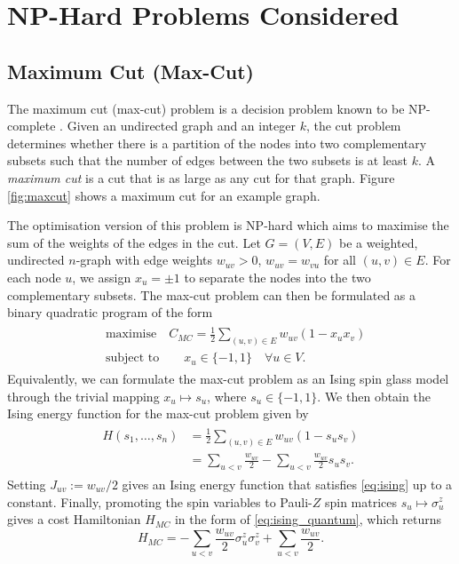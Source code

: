 
\section{NP-Hard Problems Considered} \label{sec:problem}
    \subsection{Maximum Cut (Max-Cut)}
        The maximum cut (max-cut) problem is a decision problem known to be NP-complete \cite{karp2010reducibility}. Given an undirected graph and an integer $k$, the cut problem determines whether there is a partition of the nodes into two complementary subsets such that the number of edges between the two subsets is at least $k$. A \emph{maximum cut} is a cut that is as large as any cut for that graph. Figure \ref{fig:maxcut} shows a maximum cut for an example graph.

        The optimisation version of this problem is NP-hard which aims to maximise the sum of the weights of the edges in the cut. Let $G=(V,E)$ be a weighted, undirected $n$-graph with edge weights $w_{uv}>0$, $w_{uv}=w_{vu}$ for all $(u,v)\in E$. For each node $u$, we assign $x_u=\pm1$ to separate the nodes into the two complementary subsets. The max-cut problem can then be formulated as a binary quadratic program of the form 
        \begin{align}
        \begin{split}
            &\text{maximise} \quad  C_{MC}=\frac{1}{2}\sum_{(u,v)\in E}w_{uv}(1-x_ux_v) \\
            &\text{subject to} \quad\quad x_u\in\{-1,1\}\quad\forall u\in V.
        \end{split}
        \end{align}
        Equivalently, we can formulate the max-cut problem as an Ising spin glass model  through the trivial mapping $x_u\mapsto s_u$, where $s_u\in\{-1,1\}$. We then obtain the Ising energy function for the max-cut problem given by
        \begin{align}
            \begin{split}
                H(s_1,\dots,s_n) &= \frac{1}{2}\sum_{(u,v)\in E} w_{uv}(1-s_us_v) \\
                &=\sum_{u<v}\frac{w_{uv}}{2} - \sum_{u<v}\frac{w_{uv}}{2}s_us_v.
            \end{split}
        \end{align}
        Setting $J_{uv}:= w_{uv}/2$ gives an Ising energy function that satisfies \eqref{eq:ising} up to a constant. Finally, promoting the spin variables to Pauli-$Z$ spin matrices $s_u\mapsto\sigma_u^z$ gives a cost Hamiltonian $H_{MC}$ in the form of \eqref{eq:ising_quantum}, which returns
        \begin{equation}
            H_{MC} = -\sum_{u<v}\frac{w_{uv}}{2}\sigma^z_u\sigma^z_v+\sum_{u<v}\frac{w_{uv}}{2}.
        \end{equation}

